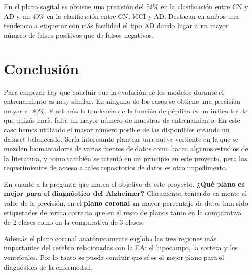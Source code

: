En el plano sagital se obtiene una precisión del 53\% en la clasificación entre CN y AD y un 40\% en la clasificación
entre CN, MCI y AD. Destacan en ambos una tendencia a etiquetar con más facilidad el tipo AD dando lugar a un mayor
número de falsos positivos que de falsos negativos.

\section{Conclusión}\label{sec:conclusion}

Para empezar hay que concluir que la evolución de los modelos durante el entrenamiento es muy similar.
En ninguno de los casos se obtiene una precisión mayor al 80\%.
Y además la tendencia de la función de pérdida es un indicador de que quizás haría falta un mayor número de muestras de
entrenamiento.
En este caso hemos utilizado el mayor número posible de las disponibles creando un dataset balanceado.
Sería interesante plantear una nueva vertiente en la que se mezclen biomarcadores de varias fuentes de datos como hacen
algunos estudios de la literatura, y como también se intentó en un principio en este proyecto, pero los requerimientos
de acceso a tales repositorios de datos es otro impedimento.

En cuanto a la pregunta que marca el objetivo de este proyecto. \textbf{¿Qué plano es mejor para el diagnóstico del
Alzheimer?} Claramente, teniendo en mente el valor de la precisión, en el \textbf{plano coronal} un mayor porcentaje
de datos han sido etiquetados de forma correcta que en el resto de planos tanto en la comparativa de 2 clases como
en la comparativa de 3 clases.

Además el plano coronal anatómicamente engloba las tres regiones más importantes del cerebro relacionadas con la EA:
el hipocampo, la corteza y los ventrículos.
Por lo tanto se puede concluir que sí es el mejor plano para el diagnóstico de la enfermedad.


